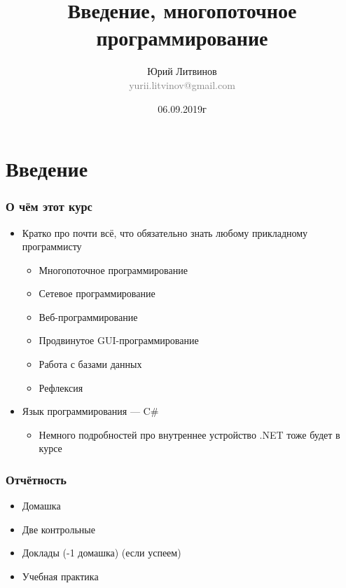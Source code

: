 \documentclass[xetex,mathserif,serif]{beamer}
\title{Введение, многопоточное программирование}
\author[Юрий Литвинов]{Юрий Литвинов\\\small{\textcolor{gray}{yurii.litvinov@gmail.com}}}
\date{06.09.2019г}
\begin{document}
	\frame{\titlepage}

	\section{Введение}

	\begin{frame}
		\frametitle{О чём этот курс}
		\begin{itemize}
			\item Кратко про почти всё, что обязательно знать любому прикладному программисту
			\begin{itemize}
				\item Многопоточное программирование
				\item Сетевое программирование
				\item Веб-программирование
				\item Продвинутое GUI-программирование
				\item Работа с базами данных
				\item Рефлексия
			\end{itemize}
			\item Язык программирования --- C\#
			\begin{itemize}
				\item Немного подробностей про внутреннее устройство .NET тоже будет в курсе
			\end{itemize}
		\end{itemize}
	\end{frame}

	\begin{frame}
		\frametitle{Отчётность}
		\begin{itemize}
			\item Домашка
			\item Две контрольные
			\item Доклады (-1 домашка) (если успеем)
			\item Учебная практика
		\end{itemize}
	\end{frame}
\end{document}
